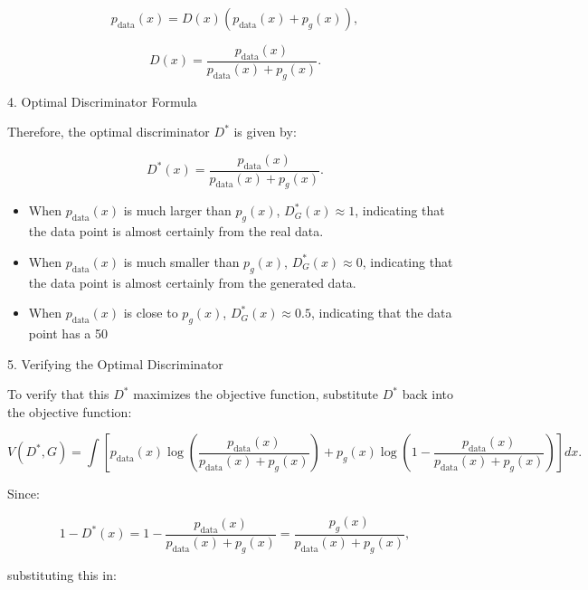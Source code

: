 \begin{equation}
    p_{\text{data}}(x) = D(x)(p_{\text{data}}(x) + p_g(x)),
\end{equation}

\begin{equation}
    D(x) = \frac{p_{\text{data}}(x)}{p_{\text{data}}(x) + p_g(x)}.
\end{equation}

4. Optimal Discriminator Formula

Therefore, the optimal discriminator \( D^* \) is given by:

\begin{equation}
    D^*(x) = \frac{p_{\text{data}}(x)}{p_{\text{data}}(x) + p_g(x)}.
\end{equation}


\begin{itemize}
    \item When \(p_{\text{data}}(x)\) is much larger than \(p_g(x)\), \(D^*_G(x) \approx 1\), indicating that the data point is almost certainly from the real data.
    \item When \(p_{\text{data}}(x)\) is much smaller than \(p_g(x)\), \(D^*_G(x) \approx 0\), indicating that the data point is almost certainly from the generated data.
    \item When \(p_{\text{data}}(x)\) is close to \(p_g(x)\), \(D^*_G(x) \approx 0.5\), indicating that the data point has a 50%
\end{itemize}


5. Verifying the Optimal Discriminator

To verify that this \( D^* \) maximizes the objective function, substitute \( D^* \) back into the objective function:

\begin{equation}
    V(D^*, G) = \int \left[ p_{\text{data}}(x) \log \left( \frac{p_{\text{data}}(x)}{p_{\text{data}}(x) + p_g(x)} \right) + p_g(x) \log \left( 1 - \frac{p_{\text{data}}(x)}{p_{\text{data}}(x) + p_g(x)} \right) \right] dx.
\end{equation}

Since:

\begin{equation}
    1 - D^*(x) = 1 - \frac{p_{\text{data}}(x)}{p_{\text{data}}(x) + p_g(x)} = \frac{p_g(x)}{p_{\text{data}}(x) + p_g(x)},
\end{equation}

substituting this in:

